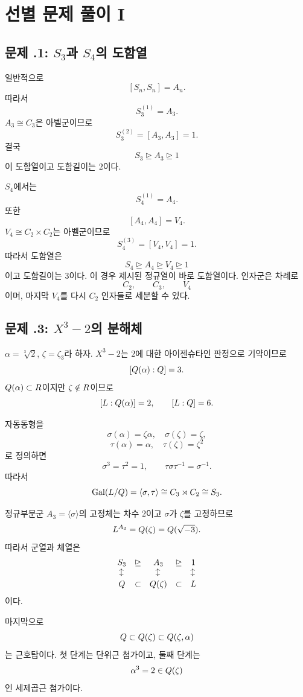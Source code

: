 \clearpage
\section{선별 문제 풀이 I}
\label{sec:radicals-solvable-solutions-a}

\subsection*{문제 \thechapter.1: $S_3$과 $S_4$의 도함열}

\begin{solution}
일반적으로
\[
  [S_n,S_n]=A_n.
\]
따라서
\[
  S_3^{(1)}=A_3.
\]
$A_3\cong C_3$은 아벨군이므로
\[
  S_3^{(2)}=[A_3,A_3]=1.
\]
결국
\[
  S_3\trianglerighteq A_3\trianglerighteq1
\]
이 도함열이고 도함길이는 $2$이다.

$S_4$에서는
\[
  S_4^{(1)}=A_4.
\]
또한
\[
  [A_4,A_4]=V_4.
\]
$V_4\cong C_2\times C_2$는 아벨군이므로
\[
  S_4^{(3)}=[V_4,V_4]=1.
\]
따라서 도함열은
\[
  \boxed{
  S_4\trianglerighteq A_4\trianglerighteq V_4
  \trianglerighteq1}
\]
이고 도함길이는 $3$이다. 이 경우 제시된 정규열이 바로 도함열이다. 인자군은 차례로
\[
  C_2,\qquad C_3,\qquad V_4
\]
이며, 마지막 $V_4$를 다시 $C_2$ 인자들로 세분할 수 있다.
\end{solution}

\subsection*{문제 \thechapter.3: $X^3-2$의 분해체}

\begin{solution}
$\alpha=\sqrt[3]{2}$, $\zeta=\zeta_3$라 하자. $X^3-2$는 $2$에 대한 아이젠슈타인 판정으로 기약이므로
\[
  [Q(\alpha):Q]=3.
\]
$Q(\alpha)\subset R$이지만 $\zeta\notin R$이므로
\[
  [L:Q(\alpha)]=2,
  \qquad
  [L:Q]=6.
\]

자동동형을
\[
  \sigma(\alpha)=\zeta\alpha,
  \quad \sigma(\zeta)=\zeta,
\]
\[
  \tau(\alpha)=\alpha,
  \quad \tau(\zeta)=\zeta^2
\]
로 정의하면
\[
  \sigma^3=\tau^2=1,
  \qquad
  \tau\sigma\tau^{-1}=\sigma^{-1}.
\]
따라서
\[
  \operatorname{Gal}(L/Q)
  =\langle\sigma,\tau\rangle
  \cong C_3\rtimes C_2\cong S_3.
\]

정규부분군 $A_3=\langle\sigma\rangle$의 고정체는 차수 $2$이고 $\sigma$가 $\zeta$를 고정하므로
\[
  L^{A_3}=Q(\zeta)=Q(\sqrt{-3}).
\]
따라서 군열과 체열은
\[
\begin{array}{ccccc}
S_3&\trianglerighteq&A_3&\trianglerighteq&1\\
\rotatebox{90}{$\leftrightarrow$}&&\rotatebox{90}{$\leftrightarrow$}&&\rotatebox{90}{$\leftrightarrow$}\\
\Q&\subset&\Q(\zeta)&\subset&L
\end{array}
\]
이다.

마지막으로
\[
  Q\subset Q(\zeta)
  \subset Q(\zeta,\alpha)
\]
는 근호탑이다. 첫 단계는 단위근 첨가이고, 둘째 단계는
\[
  \alpha^3=2\in Q(\zeta)
\]
인 세제곱근 첨가이다.
\end{solution}

